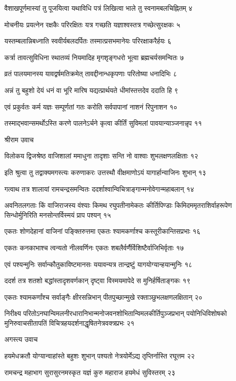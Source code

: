 वैशाखपूर्णमास्यां तु पूजयित्वा यथाविधि
पत्रं लिखित्वा भाले तु स्वनामबलचिह्नितम् ४

मोचनीयः प्रयत्नेन रक्षकैः परिरक्षितः
यत्र गच्छति यज्ञाश्वस्तत्र गच्छेत्सुरक्षकः ५

यस्तम्बलान्निबध्नाति स्ववीर्यबलदर्पितः
तस्मात्प्रसभमानेयः परिरक्षाकरैर्हयः ६

कर्त्रा तावत्सुविधिना स्थातव्यं नियमादिह
मृगशृङ्गधरो भूत्वा ब्रह्मचर्यसमन्वितः ७

व्रतं पालयमानस्य यावद्वर्षमतिक्रमेत्
तावद्दीनान्धकृपणाः परितोष्या धनादिभिः ८

अन्नं तु बहुशो देयं धनं वा भूरि मारिष
यद्यत्प्रार्थयते धीमांस्तत्तदेव ददाति हि ९

एवं प्रकुर्वतः कर्म यज्ञः सम्पूर्णतां गतः
करोति सर्वपापानां नाशनं रिपुनाशन १०

तस्माद्भवान्समर्थोऽस्ति करणे पालनेऽर्चने
कृत्वा कीर्तिं सुविमलां पावयान्याञ्जनान्नृप ११

श्रीराम उवाच

विलोकय द्विजश्रेष्ठ वाजिशालां ममाधुना
तादृशाः सन्ति नो वाश्वाः शुभलक्षणलक्षिताः १२

इति श्रुत्वा तु तद्वाक्यमगस्त्यः करुणाकरः
उत्तस्थौ वीक्षमाणोऽयं यागार्हान्वाजिनः शुभान् १३

गत्वाथ तत्र शालायां रामचन्द्रसमन्वितः
ददर्शाश्वान्विचित्राङ्गान्मनोवेगान्महाबलान् १४

अवनितलगताः किं वाजिराजस्य वंश्याः किमथ रघुपतीनामेकतः कीर्तिपिण्डाः
किमिदममृतराशिर्वाहरूपेण सिन्धोर्मुनिरिति मनसोन्तर्विस्मयं प्राप पश्यन् १५

एकतः शोणदेहानां वाजिनां पङ्क्तिरुत्तमा
एकतः श्यामकर्णाश्च कस्तूरीकान्तिसप्रभाः १६

एकतः कनकाभाश्च त्वन्यतो नीलवर्णिनः
एकतः शबलैर्वर्णैर्विशिष्टैर्वाजिभिर्वृताः १७

एवं पश्यन्मुनिः सर्वान्कौतुकाविष्टमानसः
ययावन्यत्र तान्द्रष्टुं यागयोग्यान्हयान्मुनिः १८

ददर्श तत्र शतशो बद्धांस्तादृशवर्णकान्
दृष्ट्वा विस्मयमापेदे स मुनिर्हर्षिताङ्गकः १९

एकतः श्यामकर्णांश्च सर्वाङ्गैः क्षीरसन्निभान्
पीतपुच्छान्मुखे रक्ताञ्छुभलक्षणलक्षितान् २०

निरीक्ष्य परितोऽनघान्विमलनीरधारानिभान्मनोजवनशोभितान्विमलकीर्तिपुञ्जप्रभान्
पयोनिधिविशोषको मुनिरुवाचसीतापतिं विचित्रहयदर्शनाद्धृषितनेत्रवक्त्रप्रभः २१

अगस्त्य उवाच

हयमेधक्रतौ योग्यान्वाहांस्ते बहुशः शुभान्
पश्यतो नेत्रयोर्मेऽद्य तृप्तिर्नास्ति रघूत्तम २२

रामचन्द्र महाभाग सुरासुरनमस्कृत
यज्ञं कुरु महाराज हयमेधं सुविस्तरम् २३

